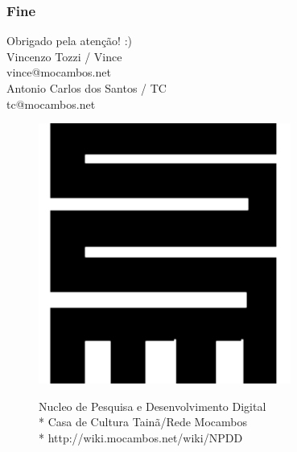 \documentclass{beamer}
\begin{document}
{ \begin{frame}
  \frametitle{Fine}
  \begin{center}
   \huge Obrigado pela atenção! :) \\
   \vfill
   \large  
   Vincenzo Tozzi / Vince \\
   \normalsize
   vince@mocambos.net \\
   \large  
   Antonio Carlos dos Santos / TC \\
   \normalsize
   tc@mocambos.net
   \vfill
   \begin{figure}[htb]
     \begin{minipage}[c]{0.10\textwidth}
       \includegraphics[width=\textwidth]{./Figuras/NPDD.pdf}
  \end{minipage}
  \begin{minipage}[c]{0.60\textwidth}
    \footnotesize
    Nucleo de Pesquisa e Desenvolvimento Digital \\*
    Casa de Cultura Tainã/Rede Mocambos\\*
    http://wiki.mocambos.net/wiki/NPDD
  \end{minipage}

\end{figure}
\end{center}
\end{frame}

} %
\end{document}
